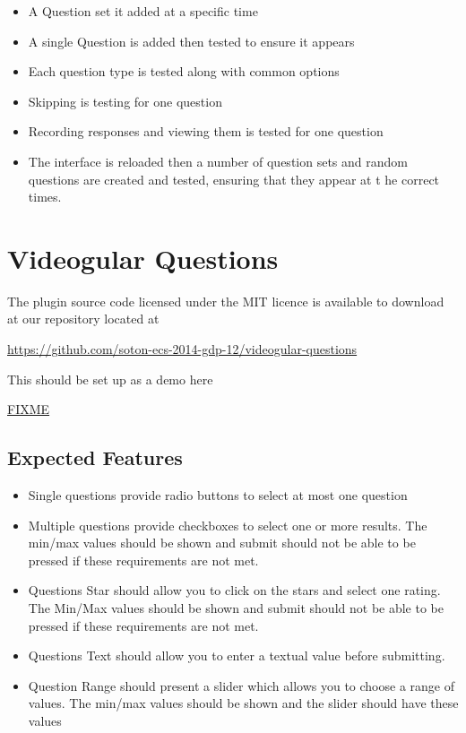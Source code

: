 \documentclass[12pt,a4paper]{article}
\begin{document}
\begin{itemize}
\item A Question set it added at a specific time
\item A single Question is added then tested to ensure it appears
\item Each question type is tested along with common options
\item Skipping is testing for one question
\item Recording responses and viewing them is tested for one question
\item The interface is reloaded then a number of question sets and random questions are created and tested, ensuring that they appear at t he correct times.
\end{itemize}

\section{Videogular Questions}

The plugin source code licensed under the MIT licence is available to download at our repository located at 

\url{https://github.com/soton-ecs-2014-gdp-12/videogular-questions}

This should be set up as a demo here

\url{FIXME}

\subsection{Expected Features}

\begin{itemize}
\item Single questions provide radio buttons to select at most one question
\item Multiple questions provide checkboxes to select one or more results. The min/max values should be shown and submit should not be able to be pressed if these requirements are not met.
\item Questions Star should allow you to click on the stars and select one rating. The Min/Max values should be shown and submit should not be able to be pressed if these requirements are not met.
\item Questions Text should allow you to enter a textual value before submitting.
\item Question Range should present a slider which allows you to choose a range of values. The min/max values should be shown and the slider should have these values
\end{itemize}
\end{document}
